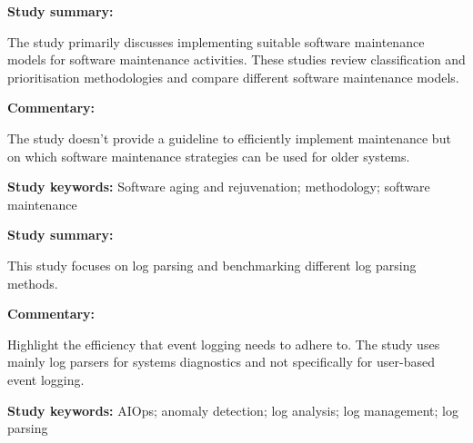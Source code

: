 \begin{tcolorbox}[colback=gray!5!white, colframe=deepblue!80!black, title=A Software Maintenance Methodology: An Approach Applied to Software Aging\cite{Araujo2021}]
	\begin{minipage}[t]{0.25\textwidth}
		\textbf{Study summary:}
	\end{minipage}
	\hfill
	\begin{minipage}[t]{0.65\textwidth}
		The study primarily discusses implementing suitable software maintenance models for software maintenance activities. These studies review classification and prioritisation methodologies and compare different software maintenance models.
	\end{minipage}

	\vspace{0.75em} 

	\begin{minipage}[t]{0.25\textwidth}
		\textbf{Commentary:}
	\end{minipage}
	\hfill
	\begin{minipage}[t]{0.65\textwidth}
		The study doesn't provide a guideline to efficiently implement maintenance but on which software maintenance strategies can be used for older systems.
	\end{minipage}
	\tcblower
	\textbf{Study keywords:} Software aging and rejuvenation; methodology; software maintenance
\end{tcolorbox}

\begin{tcolorbox}[colback=gray!5!white, colframe=deepblue!80!black, title=Tools and Benchmarks for Automated Log Parsing\cite{Zhu2019}]
	\begin{minipage}[t]{0.25\textwidth}
		\textbf{Study summary:}
	\end{minipage}
	\hfill
	\begin{minipage}[t]{0.65\textwidth}
		This study focuses on log parsing and benchmarking different log parsing methods. 
	\end{minipage}

	\vspace{0.75em} 

	\begin{minipage}[t]{0.25\textwidth}
		\textbf{Commentary:}
	\end{minipage}
	\hfill
	\begin{minipage}[t]{0.65\textwidth}
		Highlight the efficiency that event logging needs to adhere to. The study uses mainly log parsers for systems diagnostics and not specifically for user-based event logging.
	\end{minipage}
	\tcblower
	\textbf{Study keywords:} AIOps; anomaly detection; log analysis; log management; log parsing
\end{tcolorbox}

